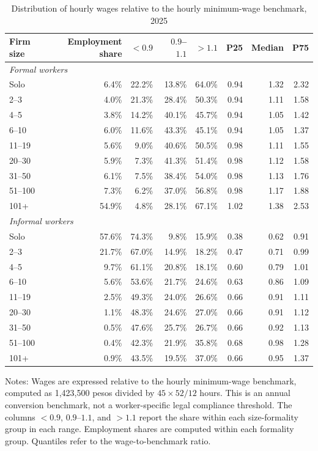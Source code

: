 \begin{table}[htbp]
  \centering
  \caption{Distribution of hourly wages relative to the hourly minimum-wage benchmark, 2025}
  \label{tab:minimum-wage-bunching-2025}
  \small
  \begin{tabular}{lrrrrrrr}
    \toprule
    Firm size & Employment share & $<0.9$ & $0.9$--$1.1$ & $>1.1$ & P25 & Median & P75 \\
    \midrule
    \multicolumn{8}{l}{\textit{Formal workers}} \\
    Solo & 6.4\% & 22.2\% & 13.8\% & 64.0\% & 0.94 & 1.32 & 2.32 \\
    2--3 & 4.0\% & 21.3\% & 28.4\% & 50.3\% & 0.94 & 1.11 & 1.58 \\
    4--5 & 3.8\% & 14.2\% & 40.1\% & 45.7\% & 0.94 & 1.05 & 1.42 \\
    6--10 & 6.0\% & 11.6\% & 43.3\% & 45.1\% & 0.94 & 1.05 & 1.37 \\
    11--19 & 5.6\% & 9.0\% & 40.6\% & 50.5\% & 0.98 & 1.11 & 1.55 \\
    20--30 & 5.9\% & 7.3\% & 41.3\% & 51.4\% & 0.98 & 1.12 & 1.58 \\
    31--50 & 6.1\% & 7.5\% & 38.4\% & 54.0\% & 0.98 & 1.13 & 1.76 \\
    51--100 & 7.3\% & 6.2\% & 37.0\% & 56.8\% & 0.98 & 1.17 & 1.88 \\
    101+ & 54.9\% & 4.8\% & 28.1\% & 67.1\% & 1.02 & 1.38 & 2.53 \\
    \midrule
    \multicolumn{8}{l}{\textit{Informal workers}} \\
    Solo & 57.6\% & 74.3\% & 9.8\% & 15.9\% & 0.38 & 0.62 & 0.91 \\
    2--3 & 21.7\% & 67.0\% & 14.9\% & 18.2\% & 0.47 & 0.71 & 0.99 \\
    4--5 & 9.7\% & 61.1\% & 20.8\% & 18.1\% & 0.60 & 0.79 & 1.01 \\
    6--10 & 5.6\% & 53.6\% & 21.7\% & 24.6\% & 0.63 & 0.86 & 1.09 \\
    11--19 & 2.5\% & 49.3\% & 24.0\% & 26.6\% & 0.66 & 0.91 & 1.11 \\
    20--30 & 1.1\% & 48.3\% & 24.6\% & 27.0\% & 0.66 & 0.91 & 1.12 \\
    31--50 & 0.5\% & 47.6\% & 25.7\% & 26.7\% & 0.66 & 0.92 & 1.13 \\
    51--100 & 0.4\% & 42.3\% & 21.9\% & 35.8\% & 0.68 & 0.98 & 1.28 \\
    101+ & 0.9\% & 43.5\% & 19.5\% & 37.0\% & 0.66 & 0.95 & 1.37 \\
    \bottomrule
  \end{tabular}
  \vspace{0.3em}
  \begin{minipage}{0.95\textwidth}
  \footnotesize
  Notes: Wages are expressed relative to the hourly minimum-wage benchmark, computed as 1,423,500 pesos divided by $45\times52/12$ hours. This is an annual conversion benchmark, not a worker-specific legal compliance threshold. The columns $<0.9$, $0.9$--$1.1$, and $>1.1$ report the share within each size-formality group in each range. Employment shares are computed within each formality group. Quantiles refer to the wage-to-benchmark ratio.
  \end{minipage}
\end{table}
